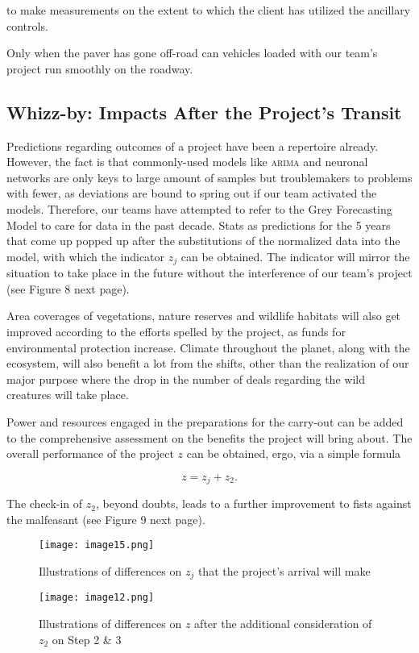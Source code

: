 \documentclass[12pt]{article}
\begin{document}
to make measurements on the extent to which the client has utilized the ancillary controls.

Only when the paver has gone off-road can vehicles loaded with our team's project run smoothly on the roadway.

\subsection{Whizz-by: Impacts After the Project's Transit}

Predictions regarding outcomes of a project have been a repertoire already. However, the fact is that commonly-used models like \textsc{arima} and neuronal networks are only keys to large amount of samples but troublemakers to problems with fewer, as deviations are bound to spring out if our team activated the models. Therefore, our teams have attempted to refer to the Grey Forecasting Model to care for data in the past decade. Stats as predictions for the 5 years that come up popped up after the substitutions of the normalized data into the model, with which the indicator $z_j$ can be obtained. The indicator will mirror the situation to take place in the future without the interference of our team's project (see Figure 8 next page).

Area coverages of vegetations, nature reserves and wildlife habitats will also get improved according to the efforts spelled by the project, as funds for environmental protection increase. Climate throughout the planet, along with the ecosystem, will also benefit a lot from the shifts, other than the realization of our major purpose where the drop in the number of deals regarding the wild creatures will take place.

Power and resources engaged in the preparations for the carry-out can be added to the comprehensive assessment on the benefits the project will bring about. The overall performance of the project $z$ can be obtained, ergo, via a simple formula

\begin{equation}
	z=z_j+z_2.
\end{equation}

The check-in of $z_2$, beyond doubts, leads to a further improvement to fists against the malfeasant (see Figure 9 next page).

\begin{figure}[htbp]
\centering
	\texttt{[image: image15.png]}
	\caption{Illustrations of differences on $z_j$ that the project's arrival will make}
\end{figure}
\begin{figure}[htbp]
	\texttt{[image: image12.png]}
	\caption{Illustrations of differences on $z$ after the additional consideration of $z_2$ on Step 2 \& 3}
\end{figure}
\clearpage
\end{document}
